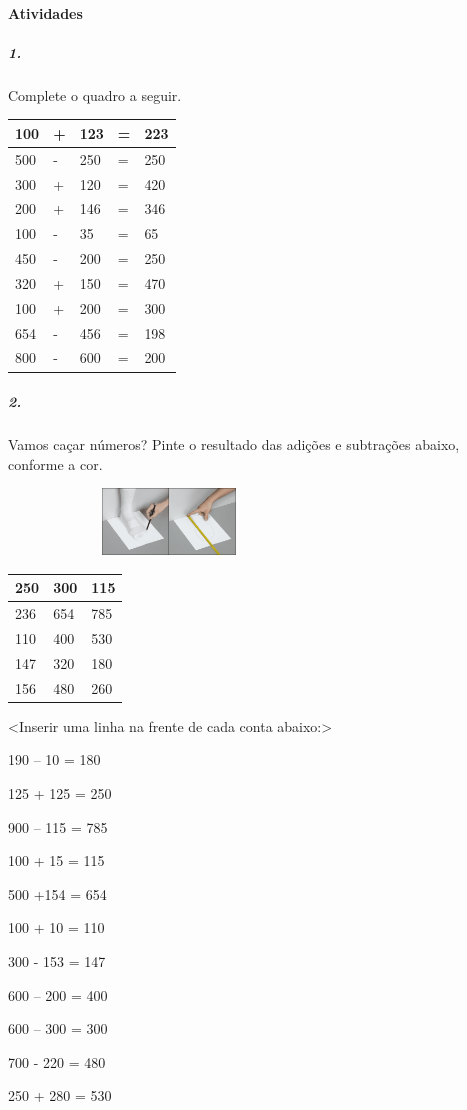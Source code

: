 \paragraph{Atividades }\label{atividades-1}

\subparagraph{1. }\label{section-14}

Complete o quadro a seguir.

\begin{longtable}[]{@{}lllll@{}}
\toprule
100 & + & 123 & = & 223\tabularnewline
\midrule
\endhead
500 & - & 250 & = & 250\tabularnewline
300 & + & 120 & = & 420\tabularnewline
200 & + & 146 & = & 346\tabularnewline
100 & - & 35 & = & 65\tabularnewline
450 & - & 200 & = & 250\tabularnewline
320 & + & 150 & = & 470\tabularnewline
100 & + & 200 & = & 300\tabularnewline
654 & - & 456 & = & 198\tabularnewline
800 & - & 600 & = & 200\tabularnewline
\bottomrule
\end{longtable}

\subparagraph{2. }\label{section-15}

Vamos caçar números? Pinte o resultado das adições e subtrações abaixo,
conforme a cor.

\includegraphics[width=3.35417in,height=0.69792in]{media/image29.png}

\begin{longtable}[]{@{}lll@{}}
\toprule
250 & 300 & 115\tabularnewline
\midrule
\endhead
236 & 654 & 785\tabularnewline
110 & 400 & 530\tabularnewline
147 & 320 & 180\tabularnewline
156 & 480 & 260\tabularnewline
\bottomrule
\end{longtable}

\textless{}Inserir uma linha na frente de cada conta
abaixo:\textgreater{}

190 -- 10 = 180

125 + 125 = 250

900 -- 115 = 785

100 + 15 = 115

500 +154 = 654

100 + 10 = 110

300 - 153 = 147

600 -- 200 = 400

600 -- 300 = 300

700 - 220 = 480

250 + 280 = 530

